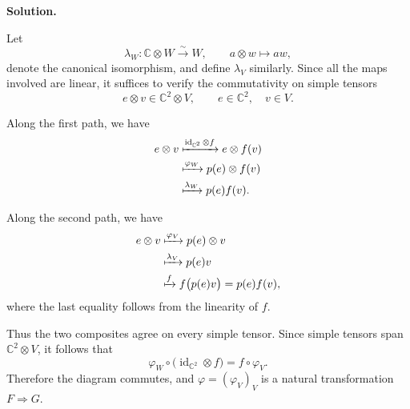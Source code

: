 \documentclass[11pt,a4paper]{article}
\newcounter{problem}
\newcounter{saveequation}
\newenvironment{solution}
{
	\par
	\setcounter{saveequation}{\value{equation}}
	\begingroup
	\setcounter{equation}{0}
	\renewcommand{\theequation}{\arabic{problem}.\arabic{equation}}
	\renewcommand{\theHequation}{sol.\arabic{problem}.\arabic{equation}}
	\noindent\textbf{Solution.}\quad
}
{
	\par
	\endgroup
	\setcounter{equation}{\value{saveequation}}
}
\begin{document}
	\begin{solution}
		Let
		\[
		\lambda_W:\mathbb{C}\otimes W \xrightarrow{\sim} W,
		\qquad
		a\otimes w \longmapsto aw,
		\]
		denote the canonical isomorphism, and define $\lambda_V$ similarly.
		Since all the maps involved are linear, it suffices to verify the
		commutativity on simple tensors
		\[
		e\otimes v\in\mathbb{C}^2\otimes V,
		\qquad
		e\in\mathbb{C}^2,\quad v\in V.
		\]
		
		Along the first path, we have
		\[
		\begin{aligned}
			e\otimes v
			&\xmapsto{\operatorname{id}_{\mathbb{C}^2}\otimes f}
			e\otimes f(v) \\
			&\xmapsto{\varphi_W}
			p(e)\otimes f(v) \\
			&\xmapsto{\lambda_W}
			p(e)f(v).
		\end{aligned}
		\]
		
		Along the second path, we have
		\[
		\begin{aligned}
			e\otimes v
			&\xmapsto{\varphi_V}
			p(e)\otimes v \\
			&\xmapsto{\lambda_V}
			p(e)v \\
			&\xmapsto{f}
			f\bigl(p(e)v\bigr)
			=
			p(e)f(v),
		\end{aligned}
		\]
		where the last equality follows from the linearity of $f$.
		
		Thus the two composites agree on every simple tensor. Since simple
		tensors span $\mathbb{C}^2\otimes V$, it follows that
		\[
		\varphi_W\circ
		\bigl(\operatorname{id}_{\mathbb{C}^2}\otimes f\bigr)
		=
		f\circ\varphi_V.
		\]
		Therefore the diagram commutes, and
		$\varphi=(\varphi_V)_V$ is a natural transformation
		$F\Rightarrow G$.
	\end{solution}
	
\end{document}
